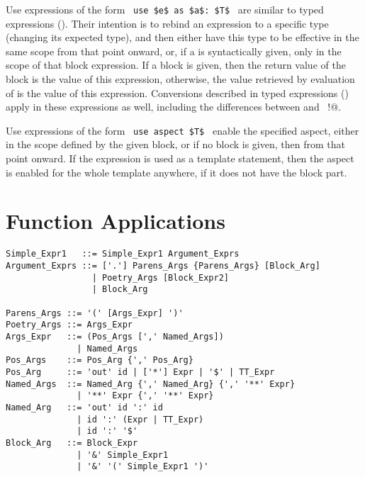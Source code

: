 Use expressions of the form ~\lstinline!use $e$ as $a$: $T$!~ are similar to typed expressions (). Their intention is to rebind an expression to a specific type (changing its expected type), and then either have this type to be effective in the same scope from that point onward, or, if a  is syntactically given, only in the scope of that block expression. If a block is given, then the return value of the block is the value of this expression, otherwise, the value retrieved by evaluation of  is the value of this expression. Conversions described in typed expressions () apply in these expressions as well, including the differences between  and ~\lstinline@as!@. 

Use expressions of the form ~\lstinline!use aspect $T$!~ enable the specified aspect, either in the scope defined by the given block, or if no block is given, then from that point onward. If the expression is used as a template statement, then the aspect is enabled for the whole template anywhere, if it does not have the block part. 








\section{Function Applications}
\label{sec:function-applications}

\syntax\begin{lstlisting}[mathescape=false]
Simple_Expr1   ::= Simple_Expr1 Argument_Exprs 
Argument_Exprs ::= ['.'] Parens_Args {Parens_Args} [Block_Arg] 
                 | Poetry_Args [Block_Expr2]
                 | Block_Arg

Parens_Args ::= '(' [Args_Expr] ')'
Poetry_Args ::= Args_Expr
Args_Expr   ::= (Pos_Args [',' Named_Args])
              | Named_Args
Pos_Args    ::= Pos_Arg {',' Pos_Arg}
Pos_Arg     ::= 'out' id | ['*'] Expr | '$' | TT_Expr
Named_Args  ::= Named_Arg {',' Named_Arg} {',' '**' Expr}
              | '**' Expr {',' '**' Expr}
Named_Arg   ::= 'out' id ':' id
              | id ':' (Expr | TT_Expr)
              | id ':' '$'
Block_Arg   ::= Block_Expr 
              | '&' Simple_Expr1 
              | '&' '(' Simple_Expr1 ')'
\end{lstlisting}


